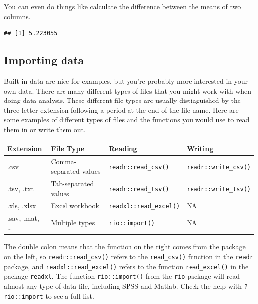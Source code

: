 \documentclass[
  oneside]{book}
\newenvironment{Shaded}{\begin{snugshade}}{\end{snugshade}}
\newcommand{\FunctionTok}[1]{\textcolor[rgb]{0.00,0.00,0.00}{#1}}
\newcommand{\NormalTok}[1]{#1}
\newcommand{\OtherTok}[1]{\textcolor[rgb]{0.56,0.35,0.01}{#1}}
\newcommand{\SpecialCharTok}[1]{\textcolor[rgb]{0.00,0.00,0.00}{#1}}
\begin{document}
You can even do things like calculate the difference between the means of two columns.

\begin{Shaded}
\end{Shaded}

\begin{verbatim}
## [1] 5.223055
\end{verbatim}

\hypertarget{import_data}{%
\subsection{Importing data}\label{import_data}}

Built-in data are nice for examples, but you're probably more interested in your own data. There are many different types of files that you might work with when doing data analysis. These different file types are usually distinguished by the three letter extension following a period at the end of the file name. Here are some examples of different types of files and the functions you would use to read them in or write them out.

\begin{longtable}[]{@{}llll@{}}
\toprule
Extension & File Type & Reading & Writing \\
\midrule
\endhead
.csv & Comma-separated values & \texttt{readr::read\_csv()} & \texttt{readr::write\_csv()} \\
.tsv, .txt & Tab-separated values & \texttt{readr::read\_tsv()} & \texttt{readr::write\_tsv()} \\
.xls, .xlsx & Excel workbook & \texttt{readxl::read\_excel()} & NA \\
.sav, .mat, \ldots{} & Multiple types & \texttt{rio::import()} & NA \\
\bottomrule
\end{longtable}

The double colon means that the function on the right comes from the package on the left, so \texttt{readr::read\_csv()} refers to the \texttt{read\_csv()} function in the \texttt{readr} package, and \texttt{readxl::read\_excel()} refers to the function \texttt{read\_excel()} in the package \texttt{readxl}. The function \texttt{rio::import()} from the \texttt{rio} package will read almost any type of data file, including SPSS and Matlab. Check the help with \texttt{?rio::import} to see a full list.
\end{document}
